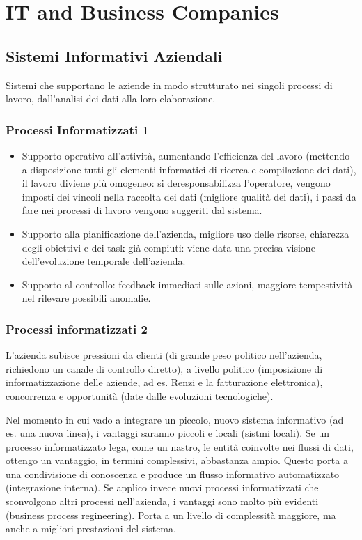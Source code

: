 \chapter{IT and Business Companies}
\label{chap:IT and Business Companies}
\section{Sistemi Informativi Aziendali}
\label{sec:Business Information System}
Sistemi che supportano le aziende in modo strutturato nei singoli processi di lavoro,
dall'analisi dei dati alla loro elaborazione.
\subsection{Processi Informatizzati 1}
\begin{itemize}
  \item Supporto operativo all'attivit\`a, aumentando l'efficienza del lavoro (mettendo a disposizione
  tutti gli elementi informatici di ricerca e compilazione dei dati), il lavoro diviene pi\`u omogeneo: si
  deresponsabilizza l'operatore, vengono imposti dei vincoli nella raccolta dei dati (migliore
  qualit\`a dei dati), i passi da fare nei processi di lavoro vengono suggeriti dal sistema.
  \item Supporto alla pianificazione dell'azienda, migliore uso delle risorse, chiarezza
  degli obiettivi e dei task gi\`a compiuti: viene data una precisa visione dell'evoluzione
  temporale dell'azienda.
  \item Supporto al controllo: feedback immediati sulle azioni, maggiore tempestivit\`a nel
  rilevare possibili anomalie.
\end{itemize}

\subsection{Processi informatizzati 2}
\label{sub:Processi informatizzati}
L'azienda subisce pressioni da clienti (di grande peso politico nell'azienda, richiedono un canale di controllo diretto),
a livello politico (imposizione
di informatizzazione delle aziende, ad es. Renzi e la fatturazione elettronica),
 concorrenza e opportunit\`a (date dalle evoluzioni tecnologiche).

Nel momento in cui vado a integrare un piccolo, nuovo sistema informativo (ad es. una nuova linea),
i vantaggi saranno piccoli e locali (sistmi locali).
Se un processo informatizzato lega, come un nastro, le entit\`a coinvolte nei flussi di dati, ottengo un vantaggio, in termini complessivi,
abbastanza ampio. Questo porta a una condivisione di conoscenza e produce un flusso informativo
automatizzato (integrazione interna).
Se applico invece nuovi processi informatizzati che sconvolgono altri processi nell'azienda, i vantaggi sono
molto pi\`u evidenti (business process regineering). Porta a un livello di
complessit\`a maggiore, ma anche a migliori prestazioni del sistema.

